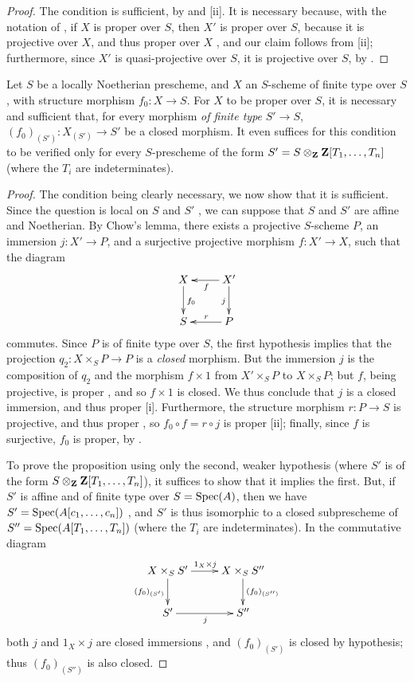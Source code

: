\begin{proof}
\label{proof-2.5.6.2}
The condition is sufficient, by  and [ii].
It is necessary because, with the notation of , if $X$ is proper over $S$, then $X'$ is proper over $S$, because it is projective over $X$, and thus proper over $X$ , and our claim follows from [ii];
furthermore, since $X'$ is quasi-projective over $S$, it is projective over $S$, by .
\end{proof}

\begin{cor}[5.6.3]
\label{2.5.6.3}
Let $S$ be a locally Noetherian prescheme, and $X$ an $S$-scheme of finite type over $S$, with structure morphism $f_0:X\to S$.
For $X$ to be proper over $S$, it is necessary and sufficient that, for every morphism \emph{of finite type} $S'\to S$, $(f_0)_{(S')}:X_{(S')}\to S'$ be a closed morphism.
It even suffices for this condition to be verified only for every $S$-prescheme of the form $S'=S\otimes_\mathbf{Z}\mathbf{Z}[T_1,\ldots,T_n]$ (where the $T_i$ are indeterminates).
\end{cor}

\begin{proof}
\label{proof-2.5.6.3}
The condition being clearly necessary, we now show that it is sufficient.
Since the question is local on $S$ and $S'$ , we can suppose that $S$ and $S'$ are affine and Noetherian.
By Chow's lemma, there exists a projective $S$-scheme $P$, an immersion $j:X'\to P$, and a surjective projective morphism $f:X'\to X$, such that the diagram
\[
  \xymatrix{
    X \ar[d]^{f_0}
    & X' \ar[l]^f \ar[d]_j\\
    S
    & P \ar[l]_r
  }
\]
commutes.
Since $P$ is of finite type over $S$, the first hypothesis implies that the projection $q_2:X\times_S P\to P$ is a \emph{closed} morphism.
But the immersion $j$ is the composition of $q_2$ and the morphism $f\times1$ from $X'\times_S P$ to $X\times_S P$;
but $f$, being projective, is proper , and so $f\times1$ is closed.
We thus conclude that $j$ is a closed immersion, and thus proper [i].
Furthermore, the structure morphism $r:P\to S$ is projective, and thus proper , so $f_0\circ f=r\circ j$ is proper [ii];
finally, since $f$ is surjective, $f_0$ is proper, by .

To prove the proposition using only the second, weaker hypothesis (where $S'$ is of the form $S\otimes_\mathbf{Z}\mathbf{Z}[T_1,\ldots,T_n]$), it suffices to show that it implies the first.
But, if $S'$ is affine and of finite type over $S={\mathop{\mathrm{Spec}}\nolimits}(A)$,
then we have $S'={\mathop{\mathrm{Spec}}\nolimits}(A[c_1,\ldots,c_n])$ , and $S'$ is thus isomorphic to a closed subprescheme of $S''={\mathop{\mathrm{Spec}}\nolimits}(A[T_1,\ldots,T_n])$ (where the $T_i$ are indeterminates).
In the commutative diagram
\[
  \xymatrix{
    X\times_S S' \ar[r]^{1_X\times j} \ar[d]_{(f_0)_{(S')}}
    & X\times_S S'' \ar[d]^{(f_0)_{(S'')}}\\
    S' \ar[r]_j
    & S''
  }
\]
both $j$ and $1_X\times j$ are closed immersions , and $(f_0)_{(S')}$ is closed by hypothesis;
thus $(f_0)_{(S'')}$ is also closed.
\end{proof}
